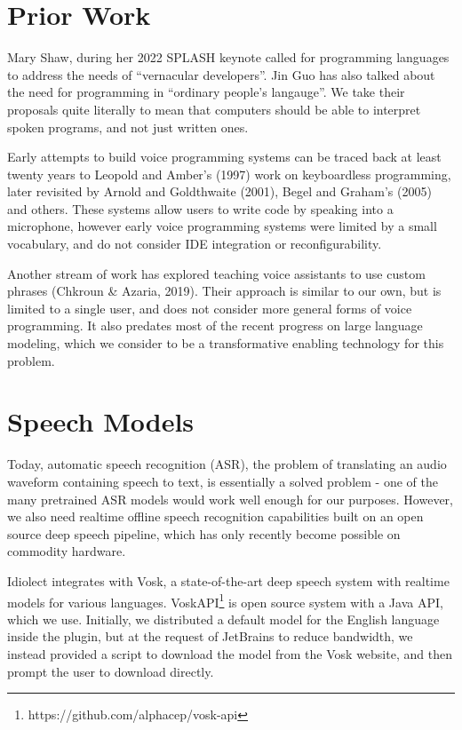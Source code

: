 \documentclass[conference]{IEEEtran}
\begin{document}
\section{Prior Work}

Mary Shaw, during her 2022 SPLASH keynote called for programming languages to address the needs of ``vernacular developers''. Jin Guo has also talked about the need for programming in ``ordinary people's langauge''. We take their proposals quite literally to mean that computers should be able to interpret spoken programs, and not just written ones.

Early attempts to build voice programming systems can be traced back at least twenty years to Leopold and Amber's (1997) work on keyboardless programming, later revisited by Arnold and Goldthwaite (2001), Begel and Graham's (2005) and others. These systems allow users to write code by speaking into a microphone, however early voice programming systems were limited by a small vocabulary, and do not consider IDE integration or reconfigurability.

Another stream of work has explored teaching voice assistants to use custom phrases (Chkroun \& Azaria, 2019). Their approach is similar to our own, but is limited to a single user, and does not consider more general forms of voice programming. It also predates most of the recent progress on large language modeling, which we consider to be a transformative enabling technology for this problem.

\section{Speech Models}

Today, automatic speech recognition (ASR), the problem of translating an audio waveform containing speech to text, is essentially a solved problem - one of the many pretrained ASR models would work well enough for our purposes. However, we also need realtime offline speech recognition capabilities built on an open source deep speech pipeline, which has only recently become possible on commodity hardware.

Idiolect integrates with Vosk, a state-of-the-art deep speech system with realtime models for various languages. VoskAPI\footnote{https://github.com/alphacep/vosk-api} is open source system with a Java API, which we use. Initially, we distributed a default model for the English language inside the plugin, but at the request of JetBrains to reduce bandwidth, we instead provided a script to download the model from the Vosk website, and then prompt the user to download directly.
\end{document}

